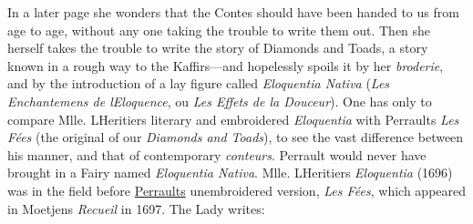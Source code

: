 \documentclass[14pt,a4paper]{memoir}
\newcommand{\ul}[1]{\uline{#1}}
\begin{document}
In a later page she wonders that the Contes should have been
\textquotesingle handed to us from age to age, without any one taking
the trouble to write them out.\textquotesingle{} Then she herself takes
the trouble to write the story of Diamonds and Toads, a story known in a
rough way to the Kaffirs---and hopelessly spoils it by her
\emph{broderie}, and by the introduction of a lay figure called
\emph{Eloquentia Nativa} (\emph{Les Enchantemens de
l\textquotesingle Eloquence}, ou \emph{Les Effets de la Douceur}). One
has only to compare Mlle. L\textquotesingle Heritier\textquotesingle s
literary and embroidered \emph{Eloquentia} with
Perrault\textquotesingle s \emph{Les Fées} (the original of our
\emph{Diamonds and Toads}), to see the vast difference between his
manner, and that of contemporary \emph{conteurs}. Perrault would never
have brought in a Fairy named \emph{Eloquentia Nativa}. Mlle.
L\textquotesingle Heritier\textquotesingle s \emph{Eloquentia} (1696)
was in the field before \ul{Perrault\textquotesingle s} unembroidered
version, \emph{Les Fées}, which appeared in Moetjens\textquotesingle{}
\emph{Recueil} in 1697. The Lady writes:
\end{document}
